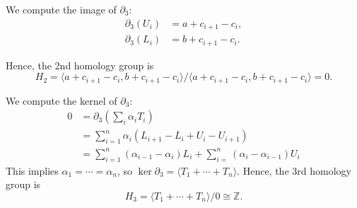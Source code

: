 \documentclass[12pt]{article}
\theoremstyle{definition}
\newcommand{\Z}{\mathbb{Z}}
\newcommand{\<}{\langle}
\renewcommand{\>}{\rangle}
\newcommand{\iso}{\cong}
\newcommand{\bd}{\partial}
\begin{document}
We compute the image of $\bd_3$:
\begin{align*}
    \bd_3(U_i) &= a + c_{i+1} - c_i, \\
    \bd_3(L_i) &= b + c_{i+1} - c_i.
\end{align*}

Hence, the 2nd homology group is
\[
    H_2
        = \<a + c_{i+1} - c_i, b + c_{i+1} - c_i\>/\<a + c_{i+1} - c_i, b + c_{i+1} - c_i\>
        = 0.
\]

We compute the kernel of $\bd_3$:
\begin{align*}
    0 
        &= \bd_3(\textstyle\sum_i \alpha_i T_i) \\
        &= \sum_{i=1}^{n} \alpha_i(L_{i+1} - L_i + U_i - U_{i+1}) \\
        &= \sum_{i=1}^{n} (\alpha_{i-1} - \alpha_i)L_i + \sum_{i=}^{n} (\alpha_i - \alpha_{i-1}) U_i 
\end{align*}
This implies $\alpha_1 = \cdots = \alpha_n$, so $\ker\bd_3 = \<T_1 + \cdots + T_n\>$.
Hence, the 3rd homology group is
\[
    H_3 = \<T_1 + \cdots + T_n\>/0 \iso \Z.
\]
\end{document}
